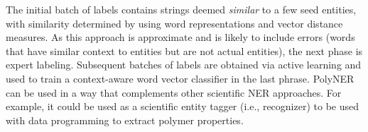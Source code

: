 The initial batch of labels contains strings deemed \textit{similar} to a few seed entities, 
with similarity determined by using word representations and vector distance measures.
As this approach is approximate and is likely to include errors (words that have similar context to entities but are not actual entities), the next phase is expert labeling. 
Subsequent batches of labels are obtained via active learning and used 
 to train a context-aware word vector classifier in the last phrase.
PolyNER can be used in a way that complements other scientific NER approaches. 
For example, it could be used as a scientific entity tagger (i.e., recognizer) to be used with data programming to extract polymer properties.
